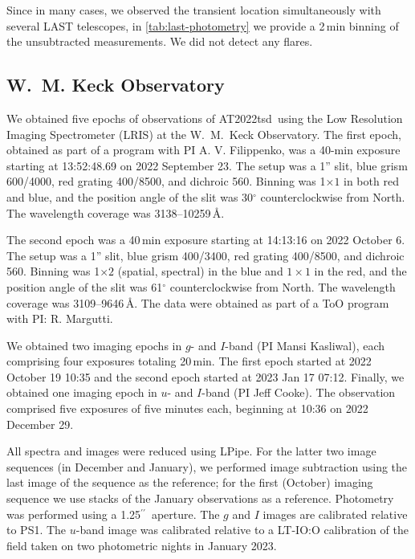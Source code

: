\documentclass{nature_plusfigure}
\newcommand{\at}{AT2022tsd}
\newcommand{\ayqh}[1]{{\textcolor{red}{\texttt{AYQH: #1}}}}
\newcommand{\arcsec}{$^{\prime\prime}$}
\begin{document}
\begin{methods}
Since in many cases, we observed the transient location simultaneously with several LAST telescopes, in \ref{tab:last-photometry} we provide a 2\,min binning of the unsubtracted measurements. We did not detect any flares.



\subsection{W.~M. Keck Observatory}
\label{sec:keck}

We obtained five epochs of observations of \at\ using the Low Resolution Imaging Spectrometer (LRIS) at the W.~M.~Keck Observatory. The first epoch, obtained as part of a program with PI A. V. Filippenko, was a 40-min exposure starting at 13:52:48.69 on 2022 September 23. The setup was a 1'' slit, blue grism 600/4000, red grating 400/8500, and dichroic 560. Binning was 1$\times1$ in both red and blue, and the position angle of the slit was 30$^\circ$ counterclockwise from North. The wavelength coverage was 3138--10259\,\AA. 

The second epoch was a 40\,min exposure starting at 14:13:16 on 2022 October 6. The setup was a 1'' slit, blue grism 400/3400, red grating 400/8500, and dichroic 560. Binning was 1$\times2$ (spatial, spectral) in the blue and $1\times1$ in the red, and the position angle of the slit was 61$^\circ$ counterclockwise from North. The wavelength coverage was 3109--9646\,\AA. The data were obtained as part of a ToO program with PI: R. Margutti. 

We obtained two imaging epochs in $g$- and $I$-band (PI Mansi Kasliwal), each comprising four exposures totaling 20\,min. The first epoch started at 2022 October 19 10:35 and the second epoch started at 2023 Jan 17 07:12. 
Finally, we obtained one imaging epoch in $u$- and $I$-band (PI Jeff Cooke). The observation comprised five exposures of five minutes each, beginning at 10:36 on 2022 December 29.

All spectra and images were reduced using LPipe\cite{PerleyLPipe}.
For the latter two image sequences (in December and January), we performed image subtraction using the last image of the sequence as the reference; for the first (October) imaging sequence we use stacks of the January observations as a reference.  Photometry was performed using a 1.25\arcsec\ aperture.  The $g$ and $I$ images are calibrated relative to PS1.  The $u$-band image was calibrated relative to a LT-IO:O calibration of the field taken on two photometric nights in January 2023.


\end{methods}
\end{document}
